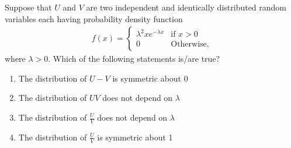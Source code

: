\documentclass[journal,12pt,twocolumn]{IEEEtran}
\theoremstyle{remark}
\begin{document}



\maketitle

\newpage


\bigskip

\renewcommand{\thefigure}{\theenumi}
\renewcommand{\thetable}{\theenumi}

%


Suppose that $U$ and $V$ are two independent and identically distributed random
variables each having probability density function
\begin{align}
f(x) = 
\begin{cases}
\lambda^{2}xe^{-\lambda x} & \text{if } x > 0\\
0 & \text{Otherwise,}
\end{cases} \label{eq:55.2023.3}
\end{align}
where $\lambda > 0$. Which of the following statements is/are true?
\begin{enumerate}
\item The distribution of $U-V$ is symmetric about 0
\item The distribution of $UV$ does not depend on $\lambda$
\item The distribution of $\frac{U}{V}$ does not depend on $\lambda$
\item The distribution of $\frac{U}{V}$ is symmetric about 1
\end{enumerate}
\end{document}
